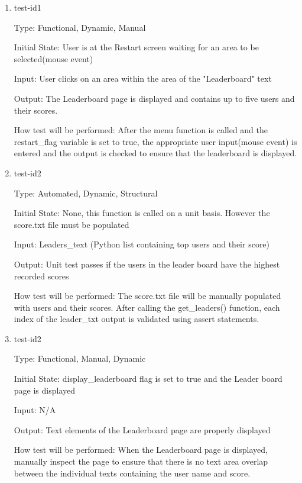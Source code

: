 \documentclass[12pt, titlepage]{article}
\begin{document}
\begin{enumerate}

\item{test-id1\\}

Type: Functional, Dynamic, Manual
					
Initial State: User is at the Restart screen waiting for an area to be selected(mouse event)
					
Input: User clicks on an area within the area of the "Leaderboard" text
					
Output: The Leaderboard page is displayed and contains up to five users and their scores.
					
How test will be performed: After the menu function is called and the restart\_flag variable is set to true, the appropriate user input(mouse event) is entered and the output is checked to ensure that the leaderboard is displayed. 

\item{test-id2\\}

Type: Automated, Dynamic, Structural
					
Initial State: None, this function is called on a unit basis. However the score.txt file must be populated
					
Input: Leaders\_text (Python list containing top users and their score)
					
Output: Unit test passes if the users in the leader board have the highest recorded scores
					
How test will be performed: The score.txt file will be manually populated with users and their scores.
After calling the get\_leaders() function, each index of the leader\_txt output is validated using assert statements.

\item{test-id2\\}

Type: Functional, Manual, Dynamic 
					
Initial State: display\_leaderboard flag is set to true and the Leader board page is displayed
					
Input: N/A
					
Output: Text elements of the Leaderboard page are properly displayed
					
How test will be performed: When the Leaderboard page is displayed, manually inspect the page to 
ensure that there is no text area overlap between the individual texts containing the user name and score. 



\end{enumerate}
\end{document}

